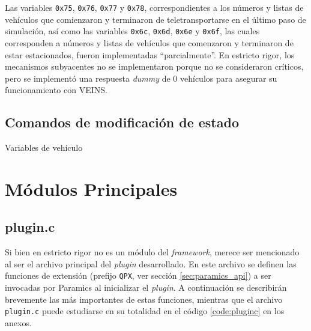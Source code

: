 \begin{description}[style=multiline]
    Las variables \texttt{0x75}, \texttt{0x76}, \texttt{0x77} y \texttt{0x78}, correspondientes a los números y listas de vehículos que comienzaron y terminaron de teletransportarse en el último paso de simulación, así como las variables \texttt{0x6c}, \texttt{0x6d}, \texttt{0x6e} y \texttt{0x6f}, las cuales corresponden a números y listas de vehículos que comenzaron y terminaron de estar estacionados, fueron implementadas ``parcialmente''. En estricto rigor, los mecanismos subyacentes no se implementaron porque no se consideraron críticos, pero se implementó una respuesta \emph{dummy} de 0 vehículos para asegurar su funcionamiento con VEINS.
    
\end{description}

\subsection{Comandos de modificación de estado}

\begin{description}[style=multiline]
    \item [\texttt{0xc4}] Variables de vehículo
    \begin{multicols}{2}
        \begin{itemize}
            
        \end{itemize}
    \end{multicols}
\end{description}


\section{Módulos Principales}
\subsection{plugin.c}

Si bien en estricto rigor no es un módulo del \emph{framework}, merece ser mencionado al ser el archivo principal del \emph{plugin} desarrollado. En este archivo se definen las funciones de extensión (prefijo \texttt{QPX}, ver sección \ref{sec:paramics_api}) a ser invocadas por Paramics al inicializar el \emph{plugin}. A continuación se describirán brevemente las más importantes de estas funciones, mientras que el archivo \texttt{plugin.c} puede estudiarse en su totalidad en el código \ref{code:pluginc} en los anexos.

